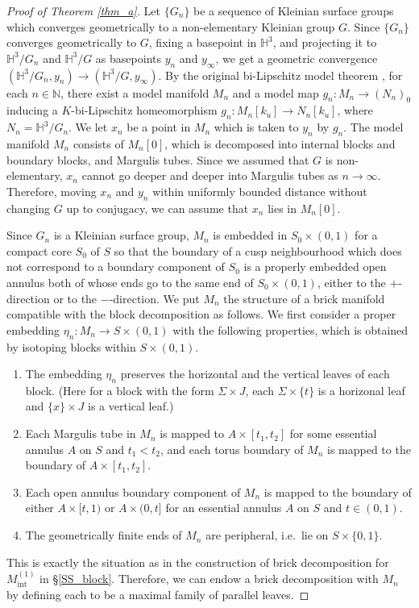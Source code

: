 \documentclass{amsart}
\theoremstyle{definition}
\numberwithin{figure}{section}
\numberwithin{equation}{section}
\newcommand{\blackboard}[1]{\ensuremath{\mathbb{#1}}}
\newcommand{\hyperbolic}{\blackboard{H}}
\newcommand{\naturals}{\blackboard{N}}
\newcommand{\ie}{i.e.\ }
\def\hh{\hyperbolic}
\def\nn{\naturals}
\begin{document}
\begin{proof}[Proof of Theorem \ref{thm_a}]
Let $\{G_n\}$ be a sequence of Kleinian surface groups which 
converges geometrically to a non-elementary Kleinian group $G$.
Since $\{G_n\}$ converges geometrically to $G$, fixing a basepoint in $\hyperbolic^3$, and projecting it to $\hyperbolic^3/G_n$ and $\hyperbolic^3/G$ as basepoints $y_n$ and $y_\infty$, we get a geometric convergence $(\hyperbolic^3/G_n, y_n) \rightarrow (\hyperbolic^3/G, y_\infty)$.
By the original bi-Lipschitz model theorem \cite{bcm}, 
for each $n\in \nn$, there exist a model manifold $M_n$ and a model map $g_n: M_n \rightarrow (N_n)_0$ inducing 
a $K$-bi-Lipschitz homeomorphism  $g_n:M_n[k_u]\rightarrow N_n[k_u]$, where $N_n=\hh^3/G_n$.
We let $x_n$ be a point in $M_n$ which is taken to $y_n$ by $g_n$.
The model manifold $M_n$ consists of $M_n[0]$, which is decomposed into internal blocks and boundary blocks, and Margulis tubes.
Since we assumed that $G$ is non-elementary, $x_n$ cannot go deeper and deeper into Margulis tubes as $n \rightarrow \infty$.
Therefore, moving $x_n$ and $y_n$ within uniformly bounded distance without changing $G$ up to conjugacy, we can assume that $x_n$ lies in $M_n[0]$.


Since $G_n$ is a Kleinian surface group, $M_n$ is embedded in $S_0 \times (0,1)$ for a compact core $S_0$ of $S$ so that the boundary of a cusp neighbourhood which does not correspond to a boundary component of $S_0$  is a properly embedded  open annulus both of whose ends go to the same end of $S_0 \times (0,1)$, either to the $+$-direction or to the $-$-direction.
We   put $M_n$ the structure of a brick manifold compatible with the block decomposition as follows.
We first consider a proper embedding $\eta_n : M_n \rightarrow S \times (0,1)$ with the following properties, which is obtained by isotoping blocks within $S \times (0,1)$.
\begin{enumerate}
\item 
The embedding $\eta_n$ preserves the horizontal and the vertical leaves of each block.
(Here for a block with the form $\Sigma \times J$, each $\Sigma \times \{t\}$ is a horizonal leaf and $\{x\} \times J$ is a vertical leaf.)
\item Each Margulis tube in $M_n$  is mapped to $A \times [t_1,t_2]$  for some essential annulus $A$ on $S$ and $t_1 < t_2$, and each torus boundary of $M_n$ is mapped to the boundary of $A \times [t_1, t_2]$.
\item 
Each open annulus boundary component of $M_n$ is mapped to the boundary of either $A\times [t, 1)$ or $A \times (0,t]$ for an essential annulus $A$ on $S$ and $t \in (0,1)$.
\item The geometrically finite ends of $M_n$ are peripheral, \ie lie on $S \times \{0,1\}$.
\end{enumerate}
This is exactly the situation as in the construction of brick decomposition for $M_\mathrm{int}^{(1)}$ in \S \ref{SS_block}.
Therefore, we can endow a brick decomposition with $M_n$ by defining  each to be   a maximal family of parallel leaves.




\end{proof}
\end{document}

